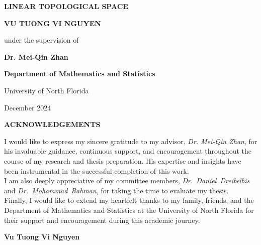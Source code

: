 \documentclass[12pt, reqno]{amsart}
\theoremstyle{definition}
\numberwithin{equation}{section}
\begin{document}
\begin{titlepage}
    \centering
    \vspace*{1cm}
    
    {\Huge\bfseries LINEAR TOPOLOGICAL SPACE\par}
    \vspace{2cm}
    
    {\Large\textbf{VU TUONG VI NGUYEN}\par}
    \vspace{2cm}
    
    {\large{under the supervision of} \par}
    {\Large\textbf{Dr. Mei-Qin Zhan}\par}
    \vspace{1.5cm}

    \vfill
    
    {\large\textbf{Department of Mathematics and Statistics} \par}
    {\large University of North Florida \par}
    \vspace{1cm}
    
    {\large December 2024 \par}
\end{titlepage}

\newpage

{\hspace*{4.5cm}\large\bfseries ACKNOWLEDGEMENTS\par}
    \vspace{1cm}
I would like to express my sincere gratitude to my advisor, \textit{Dr. Mei-Qin Zhan}, for his invaluable guidance, continuous support, and encouragement throughout the course of my research and thesis preparation. His expertise and insights have been instrumental in the successful completion of this work.\\

I am also deeply appreciative of my committee members, \textit{Dr.~Daniel~Dreibelbis} and \textit{Dr.~Mohammad~Rahman}, for taking the time to evaluate my thesis.\\

Finally, I would like to extend my heartfelt thanks to my family, friends, and the Department of Mathematics and Statistics at the University of North Florida for their support and encouragement during this academic journey.

\vspace{1.5cm}
{\hspace*{12cm}\Medium\bfseries Vu Tuong Vi Nguyen\par}
    \vspace{1cm}
\end{document}
